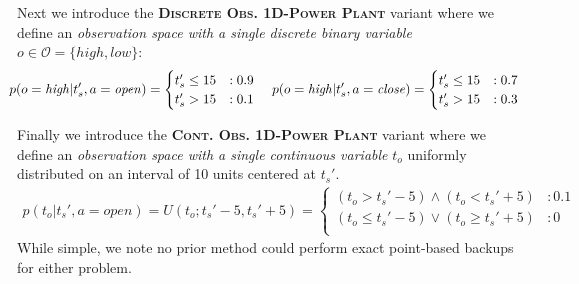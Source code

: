 \documentclass{article} %
\newcommand{\open}{\mathit{open}}
\newcommand{\close}{\mathit{close}}
\newcommand{\high}{\mathit{high}}
\newcommand{\low}{\mathit{low}}
\begin{document}
Next we introduce the \textsc{\bf Discrete Obs. 1D-Power Plant} variant where
we define an \emph{observation space with a single discrete binary 
variable} $o \in \mathcal{O} = \{\high,\low\}$:
{\footnotesize
\vspace{-1mm} 
\begin{align}
\hspace{-2.5mm} p(o=\high|t_s',a=\open) = 
\begin{cases}
  t_s' \leq 15 &: 0.9 \\
  t_s' > 15    &: 0.1 \\
\end{cases}
\;\;\;\;
p(o=\high|t_s',a=\close) = 
\begin{cases}
 t_s' \leq 15 &: 0.7 \\
 t_s' > 15    &: 0.3 \\
\end{cases} \label{eq:ex_disc_obs}
\end{align}
\vspace{-4mm}
}

Finally we introduce the \textsc{\bf Cont. Obs. 1D-Power Plant}
variant where we define an \emph{observation space with
a single continuous variable} $t_o$ uniformly distributed on
an interval of 10 units centered at $t_s'$.
{\footnotesize
\vspace{-1mm}
\begin{align}
p(t_o|t_s',a=\open) = U(t_o;t_s' - 5, t_s' + 5) = 
\begin{cases}
 (t_o>t_s'-5) \wedge (t_o<t_s'+5)         &: 0.1 \\
 (t_o \leq t_s'-5) \vee (t_o \geq t_s'+5) &: 0 \\
\end{cases} \label{eq:ex_cont_obs}
\end{align}
\vspace{-4mm}
}
While simple, we note no prior method could perform exact point-based backups for either problem.
\end{document}
